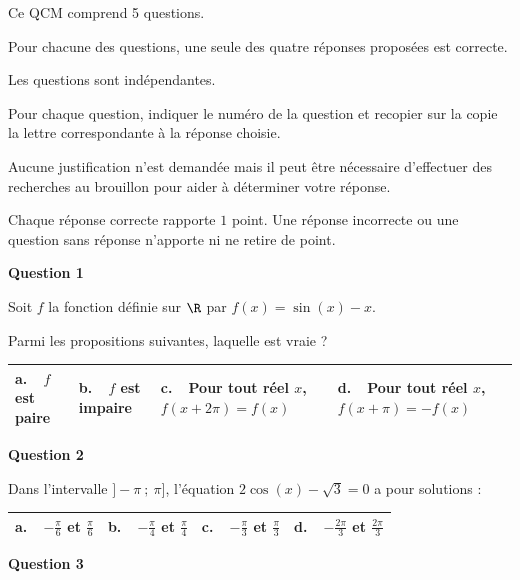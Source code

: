 \medskip

Ce QCM comprend 5 questions.

Pour chacune des questions, une seule des quatre réponses proposées est correcte.

Les questions sont indépendantes.

Pour chaque question, indiquer le numéro de la question et recopier sur la copie la lettre correspondante à la réponse choisie.

Aucune justification n'est demandée mais il peut être nécessaire d'effectuer des recherches au brouillon pour aider à déterminer votre réponse.

Chaque réponse correcte rapporte $1$ point. Une réponse incorrecte ou une question sans réponse n'apporte ni ne retire de point.

\medskip

\textbf{Question 1}

\medskip

Soit $f$ la fonction définie sur $\R$ par $f(x) = \sin(x) - x$. 

Parmi les propositions suivantes, laquelle est vraie  ?

\begin{center}
\begin{tabularx}{\linewidth}{|*{4}{X|}}\hline
\textbf{a.~~}$f$ est paire&\textbf{b.~~}$f$ est impaire&\textbf{c.~~}Pour tout réel $x$,\: $f(x +2\pi) = f(x)$&\textbf{d.~~}Pour tout réel $x$,\: $f(x +\pi) = - f(x)$\\ \hline
\end{tabularx}
\end{center}

\medskip

\textbf{Question 2}

\medskip

Dans l'intervalle $]-\pi~;~\pi]$, l'équation $2 \cos(x) - \sqrt{3} = 0$ a pour solutions :

\begin{center}
\begin{tabularx}{\linewidth}{|*{4}{X|}}\hline
\textbf{a.~~}$- \frac{\pi}{6}$ et $\frac{\pi}{6}$&\textbf{b.~~}$- \frac{\pi}{4}$ et $\frac{\pi}{4}$&\textbf{c.~~}$- \frac{\pi}{3}$ et $\frac{\pi}{3}$&\textbf{d.~~}$- \frac{2\pi}{3}$ et $\frac{2\pi}{3}$\\ \hline
\end{tabularx}
\end{center}
\medskip

\textbf{Question 3}

